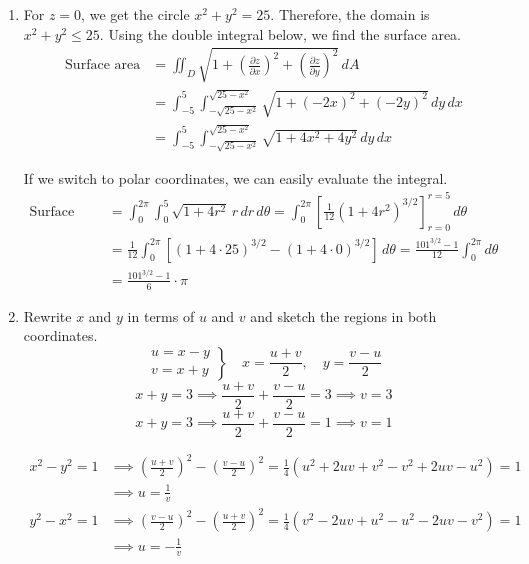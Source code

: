\documentclass[a4paper, 12pt]{article}
\begin{document}
\begin{enumerate}[leftmargin=*,label=\textbf{\arabic*.}]
The volume of this solid can be evaluated with the following integral.
\begin{align*}\text{Volume}&=\int_0^{\pi/2}\int_0^2\left(r\cos\theta-0\right)\,r\,dr\,d\theta=\int_0^{\pi/2}\int_0^2r^2\cos\theta\,dr\,d\theta\\[1em]&=\int_0^{\pi/2}\left[\frac{r^3}3\right]_{r=0}^{r=2}\cos\theta\,d\theta=\frac83\int_0^{\pi/2}\cos\theta\,d\theta=\frac83\sin\theta\,\bigg|_{0}^{\pi/2}=\frac83(1-0)=\boxed{\frac83}
\end{align*}

\newpage
\item For $z=0$, we get the circle $x^2+y^2=25$. Therefore, the domain is $x^2+y^2\leq25$. Using the double integral below, we find the surface area.
\begin{align*}
\text{Surface area}&=\iint_D\sqrt{1+\left(\frac{\partial z}{\partial x}\right)^2 +\left(\frac{\partial z}{\partial y}\right)^2}\,dA\\[1em]&=\int_{-5}^5\int_{-\sqrt{25-x^2}}^{\sqrt{25-x^2}}\sqrt{1+\left(-2x\right)^2 +\left(-2y\right)^2}\,dy\,dx\\[1em]&=\int_{-5}^5\int_{-\sqrt{25-x^2}}^{\sqrt{25-x^2}}\sqrt{1+4x^2+4y^2}\,dy\,dx
\end{align*}

If we switch to polar coordinates, we can easily evaluate the integral.
\begin{align*}\text{Surface area}&=\int_0^{2\pi}\int_0^5\sqrt{1+4r^2}\,r\,dr\,d\theta=\int_0^{2\pi}\left[\frac1{12}\left(1+4r^2\right)^{3/2}\right]_{r=0}^{r=5}\,d\theta\\[1em]&=\frac1{12}\int_0^{2\pi}\left[\left(1+4\cdot25\right)^{3/2}-\left(1+4\cdot0\right)^{3/2}\right]\,d\theta=\frac{101^{3/2}-1}{12}\int_0^{2\pi}d\theta\\[1em]&=\boxed{\frac{101^{3/2}-1}6\cdot\pi}\end{align*}

\item Rewrite $x$ and $y$ in terms of $u$ and $v$ and sketch the regions in both coordinates.
\[
\left.
\begin{array}{c}
u=x-y\\v=x+y
\end{array}\right\}
\quad \displaystyle x=\frac{u+v}2,\quad y=\frac{v-u}2
\]
\vspace{-1em}
\[x+y=3\implies\frac{u+v}2+\frac{v-u}2=3\implies v=3\]
\[x+y=3\implies\frac{u+v}2+\frac{v-u}2=1\implies v=1\]

\begin{align*}x^2-y^2=1&\implies\left(\frac{u+v}2\right)^2-\left(\frac{v-u}2\right)^2=\frac14\left(u^2+2uv+v^2-v^2+2uv-u^2\right)=1\\[1em]&\implies u=\frac1v\end{align*}
\begin{align*}y^2-x^2=1&\implies\left(\frac{v-u}2\right)^2-\left(\frac{u+v}2\right)^2=\frac14\left(v^2-2uv+u^2-u^2-2uv-v^2\right)=1\\[1em]&\implies u=-\frac1v\end{align*}


\end{enumerate}
\end{document}
